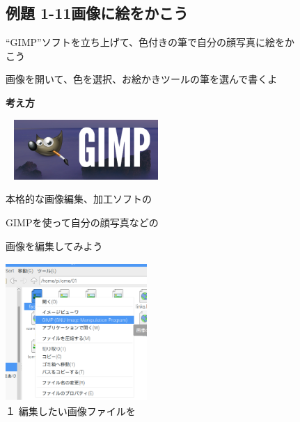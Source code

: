 \documentclass[a4paper,12pt]{jarticle}
\begin{document}
\begin{figure}[ht]
\subsection{例題 1-11画像に絵をかこう}

\bigskip

“GIMP”ソフトを立ち上げて、色付きの筆で自分の顔写真に絵をかこう

画像を開いて、色を選択、お絵かきツールの筆を選んで書くよ

	\textbf{考え方}



\begin{minipage}{\textwidth}
\centering
\includegraphics[width=6.112cm,height=2.284cm]{textbook-img123.png}
	\begin{minipage}[b]{8.617cm}

本格的な画像編集、加工ソフトの

GIMPを使って自分の顔写真などの

画像を編集してみよう
\end{minipage}


\end{minipage}
\bigskip




\begin{minipage}{\textwidth}
\centering
\begin{minipage}{5.852cm}
\includegraphics[width=5.359cm,height=5.258cm]{textbook-img124.png}\\
１ 編集したい画像ファイルを


\end{minipage}
\end{minipage}
\end{figure}
\end{document}
